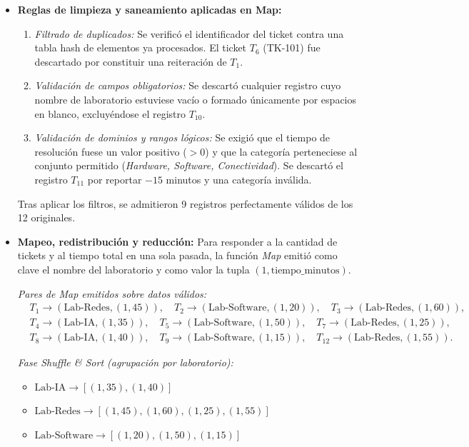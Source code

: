 \documentclass[12pt,a4paper]{article}
\begin{document}
\begin{itemize}
    \item \textbf{Reglas de limpieza y saneamiento aplicadas en Map:}
    \begin{enumerate}
        \item \textit{Filtrado de duplicados:} Se verificó el identificador del ticket contra una tabla hash de elementos ya procesados. El ticket $T_6$ (TK-101) fue descartado por constituir una reiteración de $T_1$.
        \item \textit{Validación de campos obligatorios:} Se descartó cualquier registro cuyo nombre de laboratorio estuviese vacío o formado únicamente por espacios en blanco, excluyéndose el registro $T_{10}$.
        \item \textit{Validación de dominios y rangos lógicos:} Se exigió que el tiempo de resolución fuese un valor positivo ($> 0$) y que la categoría perteneciese al conjunto permitido (\textit{Hardware, Software, Conectividad}). Se descartó el registro $T_{11}$ por reportar $-15$ minutos y una categoría inválida.
    \end{enumerate}
    Tras aplicar los filtros, se admitieron 9 registros perfectamente válidos de los 12 originales.

    \item \textbf{Mapeo, redistribución y reducción:}
    Para responder a la cantidad de tickets y al tiempo total en una sola pasada, la función \textit{Map} emitió como clave el nombre del laboratorio y como valor la tupla $(1, \text{tiempo\_minutos})$.
    
    \noindent\textit{Pares de Map emitidos sobre datos válidos:}
    \begin{align*}
        &T_1 \rightarrow (\text{Lab-Redes}, (1, 45)), \quad T_2 \rightarrow (\text{Lab-Software}, (1, 20)), \quad T_3 \rightarrow (\text{Lab-Redes}, (1, 60)), \\
        &T_4 \rightarrow (\text{Lab-IA}, (1, 35)), \quad T_5 \rightarrow (\text{Lab-Software}, (1, 50)), \quad T_7 \rightarrow (\text{Lab-Redes}, (1, 25)), \\
        &T_8 \rightarrow (\text{Lab-IA}, (1, 40)), \quad T_9 \rightarrow (\text{Lab-Software}, (1, 15)), \quad T_{12} \rightarrow (\text{Lab-Redes}, (1, 55)).
    \end{align*}

    \noindent\textit{Fase Shuffle \& Sort (agrupación por laboratorio):}
    \begin{itemize}
        \item $\text{Lab-IA} \longrightarrow [(1, 35), (1, 40)]$
        \item $\text{Lab-Redes} \longrightarrow [(1, 45), (1, 60), (1, 25), (1, 55)]$
        \item $\text{Lab-Software} \longrightarrow [(1, 20), (1, 50), (1, 15)]$
    \end{itemize}


\end{itemize}
\end{document}
